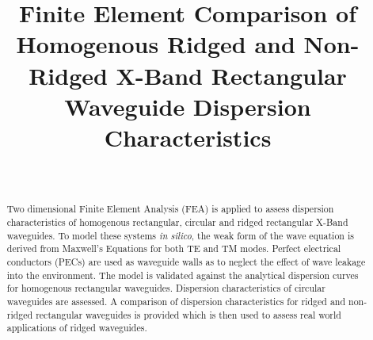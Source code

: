 \documentclass[journal]{IEEEtran}
\begin{document}
\title{Finite Element Comparison of Homogenous Ridged and Non-Ridged X-Band Rectangular Waveguide Dispersion Characteristics}

\author{
\\
}

\maketitle

\begin{abstract}
Two dimensional Finite Element Analysis (FEA) is applied to assess dispersion characteristics of homogenous rectangular, circular and ridged rectangular X-Band waveguides. To model these systems \textit{in silico}, the weak form of the wave equation is derived from Maxwell's Equations for both TE and TM modes. Perfect electrical conductors (PECs) are used as waveguide walls as to neglect the effect of wave leakage into the environment. The model is validated against the analytical dispersion curves for homogenous rectangular waveguides. Dispersion characteristics of circular waveguides are assessed. A comparison of dispersion characteristics for ridged and non-ridged rectangular waveguides is provided which is then used to assess real world applications of ridged waveguides. 
\end{abstract}

\IEEEpeerreviewmaketitle

%









\end{document}

